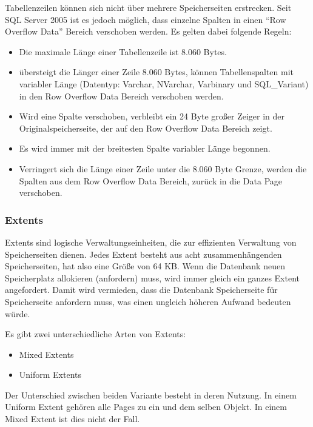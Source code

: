           Tabellenzeilen können sich nicht über mehrere Speicherseiten
          erstrecken. Seit SQL Server 2005 ist es jedoch möglich, dass
          einzelne Spalten in einen \enquote{Row Overflow Data} Bereich
          verschoben werden. Es gelten dabei folgende Regeln:
          \begin{itemize}
            \item Die maximale Länge einer Tabellenzeile ist 8.060 Bytes.
            \item übersteigt die Länger einer Zeile 8.060 Bytes, können
            Tabellenspalten mit variabler Länge (Datentyp: Varchar, NVarchar,
            Varbinary und SQL\_Variant) in den Row Overflow Data Bereich
            verschoben werden.
            \item Wird eine Spalte verschoben, verbleibt ein 24 Byte großer
            Zeiger in der Originalspeicherseite, der auf den Row Overflow Data
            Bereich zeigt.
            \item Es wird immer mit der breitesten Spalte variabler Länge
            begonnen.
            \item Verringert sich die Länge einer Zeile unter die 8.060 Byte
            Grenze, werden die Spalten aus dem Row Overflow Data Bereich,
            zurück in die Data Page verschoben.
          \end{itemize}
\clearpage         
        \subsubsection{Extents}
          \label{extents}
          Extents sind logische Verwaltungseinheiten, die zur effizienten
          Verwaltung von Speicherseiten dienen. Jedes Extent besteht aus acht
          zusammenhängenden Speicherseiten, hat also eine Größe von 64 KB.
          Wenn die Datenbank neuen Speicherplatz allokieren (anfordern) muss, wird
          immer gleich ein ganzes Extent angefordert. Damit wird vermieden, dass
          die Datenbank Speicherseite für Speicherseite anfordern muss, was
          einen ungleich höheren Aufwand bedeuten würde.
  
          Es gibt zwei unterschiedliche Arten von Extents:
          \begin{itemize}
            \item Mixed Extents
            \item Uniform Extents
          \end{itemize}
          Der Unterschied zwischen beiden Variante besteht in deren Nutzung. In
          einem Uniform Extent gehören alle Pages zu ein und dem selben Objekt.
          In einem Mixed Extent ist dies nicht der Fall.
